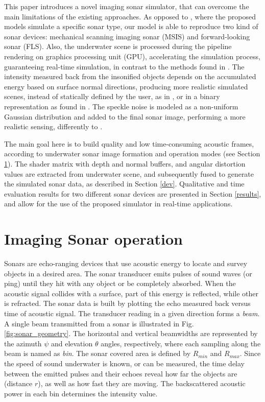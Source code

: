 \documentclass[final,5p,times]{elsarticle}
\begin{document}
This paper introduces a novel imaging sonar simulator, that can overcome
the main limitations of the existing approaches. As opposed to
\cite{bell1997,coiras2009,gueriot2010,sac2015,demarco2015,gu2013,kwak2015}, where
the proposed models simulate a specific sonar type, our model is able to
reproduce two kind of sonar devices: mechanical scanning imaging sonar (MSIS)
and forward-looking sonar (FLS). Also, the underwater scene is processed during
the pipeline rendering on graphics processing unit (GPU), accelerating the
simulation process, guaranteeing real-time simulation, in contrast to the
methods found in \cite{bell1997,coiras2009,sac2015,demarco2015}. The
intensity measured back from the insonified objects depends on the accumulated
energy based on surface normal directions, producing more realistic simulated
scenes, instead of statically defined by the user, as in \cite{demarco2015},
or in a binary representation as found in \cite{gu2013, kwak2015}. The speckle
noise is modeled as a non-uniform Gaussian distribution and added to the final
sonar image, performing a more realistic sensing, differently to
\cite{gueriot2010,sac2015,gu2013,kwak2015}.

The main goal here is to build quality and low time\hyp{}consuming acoustic
frames, according to underwater sonar image formation and operation modes
(see Section \ref{sonar:operation}). The shader matrix with depth and normal
buffers, and angular distortion values are extracted from underwater scene,
and subsequently fused to generate the simulated sonar data, as described in
Section \ref{dev}. Qualitative and time evaluation results for two different
sonar devices are presented in Section \ref{results}, and allow for the use
of the proposed simulator in real-time applications.


\section{Imaging Sonar operation}
\label{sonar:operation}

Sonars are echo-ranging devices that use acoustic energy to locate and survey
objects in a desired area. The sonar transducer emits pulses of sound waves
(or ping) until they hit with any object or be completely absorbed. When the
acoustic signal collides with a surface, part of this energy is reflected,
while other is refracted. The sonar data is built by plotting the echo measured
back versus time of acoustic signal. The transducer reading in a given direction
forms a \textit{beam}. A single beam transmitted from a sonar is illustrated in
Fig. \ref{fig:sonar_geometry}. The horizontal and vertical beamwidths are
represented by the azimuth $\psi$ and elevation $\theta$ angles, respectively,
where each sampling along the beam is named as \textit{bin}. The sonar covered
area is defined by $R_{min}$ and $R_{max}$. Since the speed of sound underwater
is known, or can be measured, the time delay between the emitted pulses and
their echoes reveal how far the objects are (distance $r$), as well as how fast
they are moving. The backscattered acoustic power in each bin determines the
intensity value.
\end{document}
